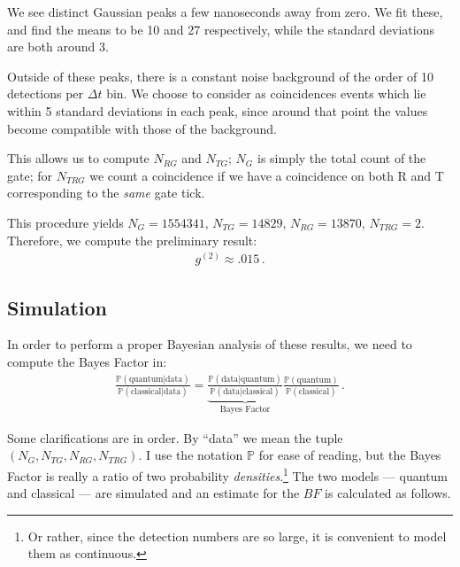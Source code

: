 \documentclass[main.tex]{subfiles}
\begin{document}
We see distinct Gaussian peaks a few nanoseconds away from zero. We fit these, and find the means to be 10 and 27 respectively, while the standard deviations are both around 3.

Outside of these peaks, there is a constant noise background of the order of 10 detections per \(\Delta t\) bin.
We choose to consider as coincidences events which lie within 5 standard deviations in each peak, since around that point the values become compatible with those of the background.

This allows us to compute \(N_{RG}\) and \(N_{TG}\); \(N_G\) is simply the total count of the gate; for \(N_{TRG}\) we count a coincidence if we have a coincidence on both R and T corresponding to the \emph{same} gate tick. 

This procedure yields \(N_G = 1554341\), \(N_{TG}=14829\), \(N_{RG}=13870\), \(N_{TRG}=2\).
Therefore, we compute the preliminary result:
%
\begin{align}
g^{(2)} \approx \num{.015}
\,.
\end{align}

\subsection{Simulation}

In order to perform a proper Bayesian analysis of these results, we need to compute the Bayes Factor in: 
%
\begin{align}
\frac{\mathbb{P}(\text{quantum} | \text{data})}{\mathbb{P}(\text{classical} | \text{data})}
= \underbrace{\frac{\mathbb{P}(\text{data} | \text{quantum})}{\mathbb{P}(\text{data} | \text{classical})}}_{\text{Bayes Factor}}
\frac{\mathbb{P}(\text{quantum})}{\mathbb{P}(\text{classical})}
\,.
\end{align}

Some clarifications are in order. By ``data'' we mean the tuple \((N_G, N_{TG}, N_{RG}, N_{TRG})\). I use the notation \(\mathbb{P}\) for ease of reading, but the Bayes Factor is really a ratio of two probability \emph{densities}.\footnote{Or rather, since the detection numbers are so large, it is convenient to model them as continuous.}
The two models --- quantum and classical --- are simulated and an estimate for the \(BF\) is calculated as follows.
\end{document}

